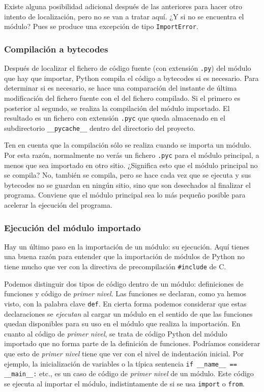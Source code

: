 {Existe alguna posibilidad adicional después de las anteriores para hacer otro intento de localización, pero no se van a tratar aquí. ¿Y si no se encuentra el módulo? Pues se produce una excepción de tipo \texttt{ImportError}.

\subsubsection{Compilación a bytecodes}

Después de localizar el fichero de código fuente (con extensión \texttt{.py}) del módulo que hay que importar, Python compila el código a bytecodes si es necesario. Para determinar si es necesario, se hace una comparación del instante de última modificación del fichero fuente con el del fichero compilado. Si el primero es posterior al segundo, se realiza la compilación del módulo importado. El resultado es un fichero con extensión \texttt{.pyc} que queda almacenado en el subdirectorio \texttt{\_\_pycache\_\_} dentro del directorio del proyecto.

Ten en cuenta que la compilación sólo se realiza cuando se importa un módulo. Por esta razón, normalmente no verás un fichero \texttt{.pyc} para el módulo principal, a menos que sea importado en otro sitio. ¿Significa esto que el módulo principal no se compila? No, también se compila, pero se hace cada vez que se ejecuta y sus bytecodes no se guardan en ningún sitio, sino que son desechados al finalizar el programa. Conviene que el módulo principal sea lo más pequeño posible para acelerar la ejecución del programa.

\subsubsection{Ejecución del módulo importado}

Hay un último paso en la importación de un módulo: su ejecución. Aquí tienes una buena razón para entender que la importación de módulos de Python no tiene mucho que ver con la directiva de precompilación \texttt{\#include} de C. 

Podemos distinguir dos tipos de código dentro de un módulo: definiciones de funciones y código de \emph{primer nivel}. Las funciones se declaran, como ya hemos visto, con la palabra clave \texttt{def}. En cierta forma podemos considerar que estas declaraciones se \emph{ejecutan} al cargar un módulo en el sentido de que las funciones quedan disponibles para su uso en el módulo que realiza la importación. En cuanto al código de \emph{primer nivel}, se trata de código Python del módulo importado que no forma parte de la definición de funciones. Podríamos considerar que esto de \emph{primer nivel} tiene que ver con el nivel de indentación inicial. Por ejemplo, la inicialización de variables o la típica sentencia \texttt{if \_\_name\_\_ == \_\_main\_\_:} etc., es un caso de código de \emph{primer nivel} de un módulo. Este código se ejecuta al importar el módulo, indistintamente de si se usa \texttt{import} o \texttt{from}.

}
